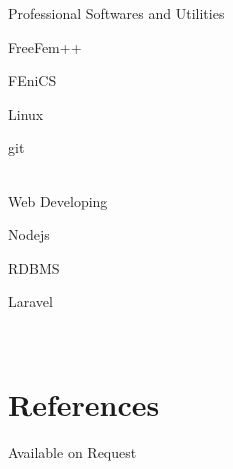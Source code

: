 \documentclass[10pt, a4paper]{article}
\newcommand{\years}[1]{\marginnote{\scriptsize #1}}
\newcommand{\sotagbox}[2][]{%
	\begin{tagbox}[#1]%
		#2
	\end{tagbox}%
}
\newcommand{\refEntry}[6]{
	\years{#1} 
	\bfseries{#2} \normalfont
	
	\vspace{.2cm}
	 \indent\hspace{.2cm} Job: #3\\
	 \indent\hspace{.2cm} Email: #4,\\
	 \indent\hspace{.2cm} Phone: #5, \\
	 \indent\hspace{.2cm} Address #6
	\normalsize\normalfont\\	  
}
\begin{document}
		\indent\hspace{.4cm}Professional Softwares and Utilities \hspace{1cm}\sotagbox{FreeFem++}  \sotagbox{FEniCS}  \sotagbox{Linux}  \sotagbox{git} \\
		
		\indent\hspace{.4cm}Web Developing \hspace{3.2cm}  \sotagbox{Nodejs}  \sotagbox{RDBMS}  \sotagbox{Laravel} \\

	\section*{References}
		Available on Request
%		
%				
%			


	
	

		
\end{document}
